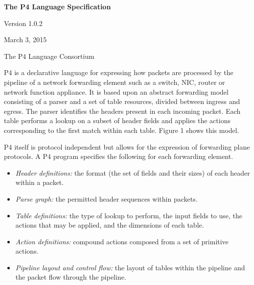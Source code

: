 \documentclass[12pt]{article}
\begin{document}
\vspace{2cm}

\centerline{\sffamily\bfseries\huge The P4 Language Specification}
\vspace{3mm}
\centerline{\sffamily\Large Version 1.0.2}
\vspace{3mm}
\centerline{\sffamily\large March 3, 2015}
\vspace{8mm}
\centerline{\sffamily\large The P4 Language Consortium}

\date{March 3, 2015}
\thispagestyle{firstpagestyle}


P4 is a declarative language for expressing how packets are processed by the 
pipeline of a network forwarding element such as a switch, NIC, router or 
network function appliance. It is based upon an abstract forwarding model 
consisting of a parser and a set of \matchaction table resources, divided 
between ingress and egress. The parser identifies the headers present in 
each incoming packet. Each \matchaction table performs a lookup on a subset 
of header fields and applies the actions corresponding to the first match 
within each table. Figure 1 shows this model.

P4 itself is protocol independent but allows for the expression of forwarding 
plane protocols. A P4 program specifies the following for each forwarding 
element.

\begin{itemize}
\item
\textit{Header definitions:} the format (the set of fields and their
sizes) of each header within a packet.
\item
\textit{Parse graph:} the permitted header sequences within packets.
\item
\textit{Table definitions:} the type of lookup to perform, the input
fields to use, the actions that may be applied, and the dimensions of
each table.
\item
\textit{Action definitions:} compound actions composed from a set of
primitive actions.
\item
\textit{Pipeline layout and control flow:} the layout of tables within
the pipeline and the packet flow through the pipeline.
\end{itemize}
\end{document}
